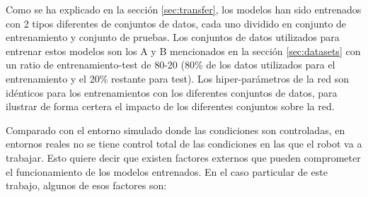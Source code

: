 Como se ha explicado en la sección \ref{sec:transfer}, los modelos han sido entrenados con 2 tipos diferentes de conjuntos de datos, cada uno dividido en conjunto de entrenamiento y conjunto de pruebas. Los conjuntos de datos utilizados para entrenar estos modelos son los A y B mencionados en la sección \ref{sec:datasets} con un ratio de entrenamiento-test de 80-20 (80\% de los datos utilizados para el entrenamiento y el 20\% restante para test). Los hiper-parámetros de la red son idénticos para los entrenamientos con los diferentes conjuntos de datos, para ilustrar de forma certera el impacto de los diferentes conjuntos sobre la red.

\noindent Comparado con el entorno simulado donde las condiciones son controladas, en entornos reales no se tiene control total de las condiciones en las que el robot va a trabajar. Esto quiere decir que existen factores externos que pueden comprometer el funcionamiento de los modelos entrenados. En el caso particular de este trabajo, algunos de esos factores son:

